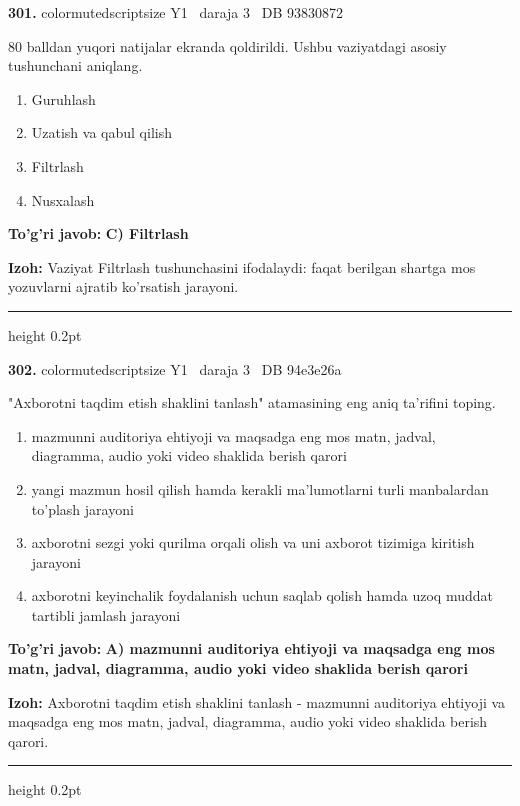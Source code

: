 \documentclass[10pt,a4paper,oneside]{article}
\begin{document}
\noindent\textbf{\color{ink}301.}  {color{muted}scriptsize Y1 \textbullet\ daraja 3 \textbullet\ DB 93830872}
\par
80 balldan yuqori natijalar ekranda qoldirildi. Ushbu vaziyatdagi asosiy tushunchani aniqlang.
\begin{enumerate}[label=\Alph*),leftmargin=9mm]
\item Guruhlash
\item Uzatish va qabul qilish
\item Filtrlash
\item Nusxalash
\end{enumerate}
\begin{tcolorbox}[enhanced,breakable,colback=teal!4,colframe=teal!50!black,boxrule=0.5pt,arc=1.1mm,left=3mm,right=3mm,top=1.7mm,bottom=1.7mm,before skip=2mm,after skip=2mm]
\textbf{\color{teal}To'g'ri javob:} \textbf{C) Filtrlash}
\par\smallskip
\textbf{Izoh:} Vaziyat Filtrlash tushunchasini ifodalaydi: faqat berilgan shartga mos yozuvlarni ajratib ko'rsatish jarayoni.
\end{tcolorbox}
\vspace{2mm}\hrule height 0.2pt \vspace{3mm}

\noindent\textbf{\color{ink}302.}  {color{muted}scriptsize Y1 \textbullet\ daraja 3 \textbullet\ DB 94e3e26a}
\par
"Axborotni taqdim etish shaklini tanlash" atamasining eng aniq ta'rifini toping.
\begin{enumerate}[label=\Alph*),leftmargin=9mm]
\item mazmunni auditoriya ehtiyoji va maqsadga eng mos matn, jadval, diagramma, audio yoki video shaklida berish qarori
\item yangi mazmun hosil qilish hamda kerakli ma'lumotlarni turli manbalardan to'plash jarayoni
\item axborotni sezgi yoki qurilma orqali olish va uni axborot tizimiga kiritish jarayoni
\item axborotni keyinchalik foydalanish uchun saqlab qolish hamda uzoq muddat tartibli jamlash jarayoni
\end{enumerate}
\begin{tcolorbox}[enhanced,breakable,colback=teal!4,colframe=teal!50!black,boxrule=0.5pt,arc=1.1mm,left=3mm,right=3mm,top=1.7mm,bottom=1.7mm,before skip=2mm,after skip=2mm]
\textbf{\color{teal}To'g'ri javob:} \textbf{A) mazmunni auditoriya ehtiyoji va maqsadga eng mos matn, jadval, diagramma, audio yoki video shaklida berish qarori}
\par\smallskip
\textbf{Izoh:} Axborotni taqdim etish shaklini tanlash - mazmunni auditoriya ehtiyoji va maqsadga eng mos matn, jadval, diagramma, audio yoki video shaklida berish qarori.
\end{tcolorbox}
\vspace{2mm}\hrule height 0.2pt \vspace{3mm}
\end{document}
